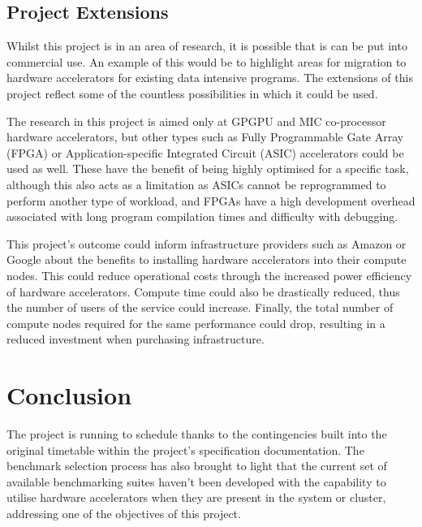 \documentclass[12pt,a4paper]{article}
\begin{document}
        \subsection{Project Extensions}
        \label{sub:project_extensions}

            Whilst this project is in an area of research, it is possible that is can be put into commercial use. An example of this would be to highlight areas for migration to hardware accelerators for existing data intensive programs. The extensions of this project reflect some of the countless possibilities in which it could be used.

            \begin{description}[style=nextline]
                \item[\textbf{Additional Accelerator Types}] The research in this project is aimed only at GPGPU and MIC co-processor hardware accelerators, but other types such as Fully Programmable Gate Array (FPGA) or Application-specific Integrated Circuit (ASIC) accelerators could be used as well. These have the benefit of being highly optimised for a specific task, although this also acts as a limitation as ASICs cannot be reprogrammed to perform another type of workload, and FPGAs have a high development overhead associated with long program compilation times and difficulty with debugging.
                \item[\textbf{Infrastructure Design}] This project's outcome could inform infrastructure providers such as Amazon or Google about the benefits to installing hardware accelerators into their compute nodes. This could reduce operational costs through the increased power efficiency of hardware accelerators. Compute time could also be drastically reduced, thus the number of users of the service could increase. Finally, the total number of compute nodes required for the same performance could drop, resulting in a reduced investment when purchasing infrastructure.
                \item[\textbf{Additional Workload Testing}] 
            \end{description}
        
    \section{Conclusion}
    \label{sec:conclusion}

        The project is running to schedule thanks to the contingencies built into the original timetable within the project's specification documentation. The benchmark selection process has also brought to light that the current set of available benchmarking suites haven't been developed with the capability to utilise hardware accelerators when they are present in the system or cluster, addressing one of the objectives of this project. 
\end{document}
